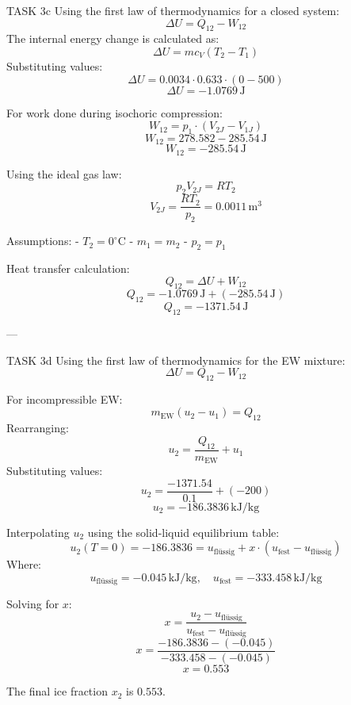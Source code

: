 TASK 3c  
Using the first law of thermodynamics for a closed system:  
\[
\Delta U = Q_{12} - W_{12}
\]  
The internal energy change is calculated as:  
\[
\Delta U = m c_V (T_2 - T_1)
\]  
Substituting values:  
\[
\Delta U = 0.0034 \cdot 0.633 \cdot (0 - 500)
\]  
\[
\Delta U = -1.0769 \, \text{J}
\]  

For work done during isochoric compression:  
\[
W_{12} = p_1 \cdot (V_{2J} - V_{1J})
\]  
\[
W_{12} = 278.582 - 285.54 \, \text{J}
\]  
\[
W_{12} = -285.54 \, \text{J}
\]  

Using the ideal gas law:  
\[
p_2 V_{2J} = R T_2
\]  
\[
V_{2J} = \frac{R T_2}{p_2} = 0.0011 \, \text{m}^3
\]  

Assumptions:  
- \( T_2 = 0^\circ \text{C} \)  
- \( m_1 = m_2 \)  
- \( p_2 = p_1 \)  

Heat transfer calculation:  
\[
Q_{12} = \Delta U + W_{12}
\]  
\[
Q_{12} = -1.0769 \, \text{J} + (-285.54 \, \text{J})
\]  
\[
Q_{12} = -1371.54 \, \text{J}
\]  

---

TASK 3d  
Using the first law of thermodynamics for the EW mixture:  
\[
\Delta U = Q_{12} - W_{12}
\]  

For incompressible EW:  
\[
m_{\text{EW}} (u_2 - u_1) = Q_{12}
\]  
Rearranging:  
\[
u_2 = \frac{Q_{12}}{m_{\text{EW}}} + u_1
\]  
Substituting values:  
\[
u_2 = \frac{-1371.54}{0.1} + (-200)
\]  
\[
u_2 = -186.3836 \, \text{kJ/kg}
\]  

Interpolating \( u_2 \) using the solid-liquid equilibrium table:  
\[
u_2(T=0) = -186.3836 = u_{\text{flüssig}} + x \cdot (u_{\text{fest}} - u_{\text{flüssig}})
\]  
Where:  
\[
u_{\text{flüssig}} = -0.045 \, \text{kJ/kg}, \quad u_{\text{fest}} = -333.458 \, \text{kJ/kg}
\]  

Solving for \( x \):  
\[
x = \frac{u_2 - u_{\text{flüssig}}}{u_{\text{fest}} - u_{\text{flüssig}}}
\]  
\[
x = \frac{-186.3836 - (-0.045)}{-333.458 - (-0.045)}
\]  
\[
x = 0.553
\]  

The final ice fraction \( x_2 \) is \( 0.553 \).